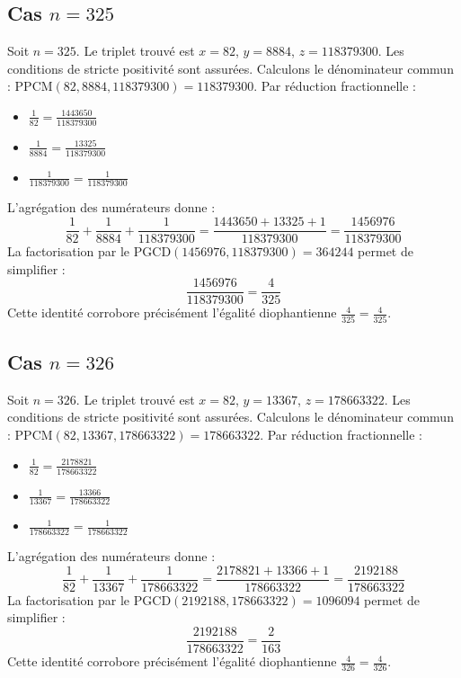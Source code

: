 \documentclass[11pt,a4paper]{article}
\begin{document}
\subsection{Cas $n = 325$}
Soit $n = 325$. Le triplet trouvé est $x = 82$, $y = 8884$, $z = 118379300$.
Les conditions de stricte positivité sont assurées.
Calculons le dénominateur commun : $\text{PPCM}(82, 8884, 118379300) = 118379300$.
Par réduction fractionnelle :
\begin{itemize}
    \item $\frac{1}{82} = \frac{1443650}{118379300}$
    \item $\frac{1}{8884} = \frac{13325}{118379300}$
    \item $\frac{1}{118379300} = \frac{1}{118379300}$
\end{itemize}
L'agrégation des numérateurs donne :
$$ \frac{1}{82} + \frac{1}{8884} + \frac{1}{118379300} = \frac{1443650 + 13325 + 1}{118379300} = \frac{1456976}{118379300} $$
La factorisation par le $\text{PGCD}(1456976, 118379300) = 364244$ permet de simplifier :
$$ \frac{1456976}{118379300} = \frac{4}{325} $$
Cette identité corrobore précisément l'égalité diophantienne $\frac{4}{325} = \frac{4}{325}$.

\subsection{Cas $n = 326$}
Soit $n = 326$. Le triplet trouvé est $x = 82$, $y = 13367$, $z = 178663322$.
Les conditions de stricte positivité sont assurées.
Calculons le dénominateur commun : $\text{PPCM}(82, 13367, 178663322) = 178663322$.
Par réduction fractionnelle :
\begin{itemize}
    \item $\frac{1}{82} = \frac{2178821}{178663322}$
    \item $\frac{1}{13367} = \frac{13366}{178663322}$
    \item $\frac{1}{178663322} = \frac{1}{178663322}$
\end{itemize}
L'agrégation des numérateurs donne :
$$ \frac{1}{82} + \frac{1}{13367} + \frac{1}{178663322} = \frac{2178821 + 13366 + 1}{178663322} = \frac{2192188}{178663322} $$
La factorisation par le $\text{PGCD}(2192188, 178663322) = 1096094$ permet de simplifier :
$$ \frac{2192188}{178663322} = \frac{2}{163} $$
Cette identité corrobore précisément l'égalité diophantienne $\frac{4}{326} = \frac{4}{326}$.
\end{document}
